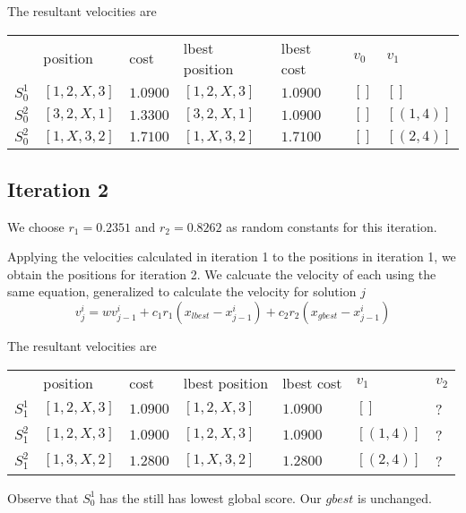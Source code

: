 \documentclass[a4paper]{article}
\begin{document}
The resultant velocities are \mbox{}
\begin{center}
\begin{tabular}{lllllll}
        & position     & cost   & lbest position & lbest cost & $v_0$  & $v_1$    \\
$S_0^1$ & $[1, 2, X, 3]$ & $1.0900$ & $[1, 2, X, 3]$   & $1.0900$     & $[]$     & $[]      $ \\
$S_0^2$ & $[3, 2, X, 1]$ & $1.3300$ & $[3, 2, X, 1]$   & $1.0900$     & $[]$     & $[(1, 4)]$ \\
$S_0^2$ & $[1, X, 3, 2]$ & $1.7100$ & $[1, X, 3, 2]$   & $1.7100$     & $[]$     & $[(2, 4)]$ \\
\end{tabular}
\end{center}

\subsection{Iteration 2}

We choose $r_1 = 0.2351$ and $r_2 = 0.8262$ as random constants for this iteration.

Applying the velocities calculated in iteration 1 to the positions in iteration 1, we obtain the positions for iteration 2. We calcuate the velocity of each using the same equation, generalized to calculate the velocity for solution $j$
$$v_j^i = w v_{j-1}^i + c_1 r_1 (x_\mathit{lbest} - x_{j-1}^i) + c_2 r_2 (x_\mathit{gbest} - x_{j-1}^i)$$

The resultant velocities are \mbox{}
\begin{center}
\begin{tabular}{lllllll}
        & position       & cost     & lbest position   & lbest cost   & $v_1$      & $v_2$    \\
$S_1^1$ & $[1, 2, X, 3]$ & $1.0900$ & $[1, 2, X, 3]$   & $1.0900$     & $[]      $ & ? \\
$S_1^2$ & $[1, 2, X, 3]$ & $1.0900$ & $[1, 2, X, 3]$   & $1.0900$     & $[(1, 4)]$ & ? \\
$S_1^2$ & $[1, 3, X, 2]$ & $1.2800$ & $[1, X, 3, 2]$   & $1.2800$     & $[(2, 4)]$ & ? \\
\end{tabular}
\end{center}

Observe that $S_0^1$ has the still has lowest global score. Our $\mathit{gbest}$ is unchanged.
\end{document}
